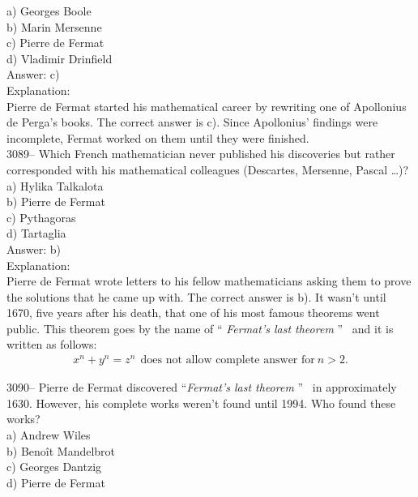 \documentclass[letterpaper, 12pt]{article}
\begin{document}
a) Georges Boole\\
b) Marin Mersenne\\
c) Pierre de Fermat\\
d) Vladimir Drinfield\\

Answer: c)\\

Explanation:\\
Pierre de Fermat started his mathematical career by rewriting one of Apollonius de Perga's books.  The correct answer is c). Since Apollonius' findings were incomplete, Fermat worked on them until they were finished.\\



3089-- Which French mathematician never published his discoveries but rather corresponded with his mathematical colleagues (Descartes, Mersenne, Pascal \dots)?\\

a) Hylika Talkalota\\
b) Pierre de Fermat\\
c) Pythagoras\\
d) Tartaglia\\

Answer: b)\\

Explanation:\\
Pierre de Fermat wrote letters to his fellow mathematicians asking them to prove the solutions that he came up with. The correct answer is b).  It wasn't until 1670, five years after his death, that one of his most famous theorems went public. This theorem goes by the name of `` \emph{Fermat's last theorem} '' \ and it is written as follows:
\begin{eqnarray*}
x^{n} + y^{n} = z^{n} \ \ \textrm{does not allow complete answer for} \ n > 2.
\end{eqnarray*}



3090-- Pierre de Fermat discovered ``\emph{Fermat's last theorem} '' \ in approximately 1630.  However, his complete works weren't found until 1994. Who found these works?\\

a) Andrew Wiles\\
b) Beno\^it Mandelbrot\\
c) Georges Dantzig\\
d) Pierre de Fermat\\
\end{document}
